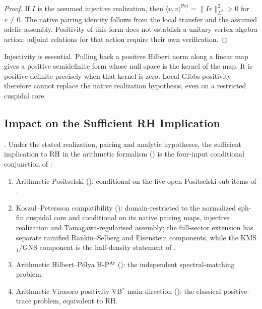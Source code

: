 \begin{proof}
If \(I\) is the assumed injective realization, then
\(\langle v,v\rangle^{\mathrm{Pet}}=\|Iv\|_{L^2}^2>0\) for
\(v\ne0\). The native pairing identity follows from the local transfer
and the assumed adelic assembly. Positivity of this form does not
establish a unitary vertex-algebra action: adjoint relations for that
action require their own verification.
\end{proof}

\begin{remark}
\label{v4-arith:kp:rem:P3-upgrade}
Injectivity is essential. Pulling back a positive Hilbert norm along a
linear map gives a positive semidefinite form whose null space is the
kernel of the map. It is positive definite precisely when that kernel
is zero. Local Gibbs positivity therefore cannot replace the native
realization hypothesis, even on a restricted cuspidal core.
\end{remark}

\subsection{Impact on the Sufficient RH Implication}
\label{v4-arith:kp:P3-unconditional:rh}

\begin{corollary}
\label{v4-arith:kp:cor:rh-minimal-updated}
\ClaimStatusProvedHereConditional. Under the stated realization,
pairing and analytic hypotheses, the sufficient implication to
RH in the arithmetic formalism
() is the four-input
conditional conjunction of
:
\begin{enumerate}
\item Arithmetic Positselski
(): conditional on the
five open Positselski sub-items of
.
\item Koszul--Petersson compatibility
(): domain-restricted to the
normalized sph-fin cuspidal core and conditional on its native
pairing maps, injective realization and Tamagawa-regularised assembly; the full-sector extension has separate
ramified Rankin--Selberg and Eisenstein components, while the
KMS\(_{1}\)/GNS component is the half-density statement of
.
\item Arithmetic Hilbert--P\'olya H-P\(^{\mathrm{Ar}}\)
(): the independent spectral-matching
problem.
\item Arithmetic Virasoro positivity VB\(^{*}\) main direction
(): the classical
positive-trace problem, equivalent to RH.
\end{enumerate}
\end{corollary}

